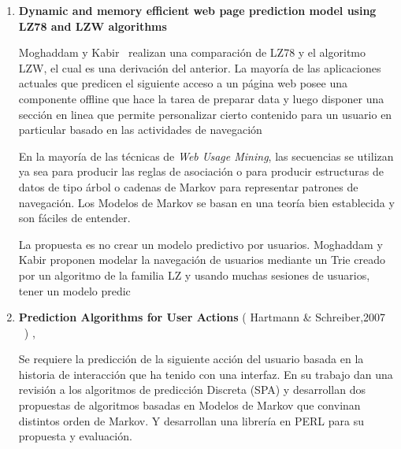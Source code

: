 \begin{enumerate}


  \item \textbf{Dynamic and memory efficient web page prediction model using LZ78 and LZW algorithms }

	Moghaddam y Kabir~\cite{Moghaddam2009}  realizan una comparación de LZ78  y el algoritmo LZW, el cual es una derivación del anterior. La mayoría de las aplicaciones actuales que predicen el siguiente acceso a un página web posee una  componente offline que hace la tarea de preparar data y luego disponer una sección en linea que permite personalizar cierto contenido para un usuario en particular basado en las actividades de navegación
	
	En la mayoría de las técnicas de \emph{Web Usage Mining}, las secuencias se utilizan ya sea para producir las reglas de asociación o para producir estructuras de datos de tipo árbol o cadenas de Markov para representar patrones de navegación. Los  Modelos de Markov se basan en una teoría bien establecida y son fáciles de entender.  
	

	La propuesta es no crear un modelo predictivo por usuarios.
	Moghaddam y Kabir proponen modelar la navegación de usuarios mediante un Trie creado por un algoritmo de la familia LZ y usando muchas sesiones de usuarios, tener un modelo predic






  \item \textbf{Prediction Algorithms for User Actions} ( Hartmann \& Schreiber,2007  \etal~\cite{hartmann2007}) , 

	{
	Se requiere la predicción de la siguiente acción del usuario basada en la historia de interacción que ha tenido con una interfaz. 
	En su trabajo dan una revisión a los algoritmos de predicción Discreta (SPA) y desarrollan dos propuestas de algoritmos basadas en Modelos de Markov que convinan distintos orden de Markov. Y desarrollan una librería en PERL para su propuesta y evaluación.
	
	
	
	
}
\end{enumerate}
